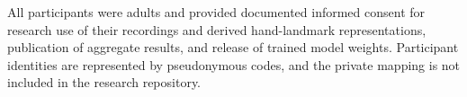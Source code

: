 All participants were adults and provided documented informed consent for research use of their recordings and derived hand-landmark representations, publication of aggregate results, and release of trained model weights. Participant identities are represented by pseudonymous codes, and the private mapping is not included in the research repository.
